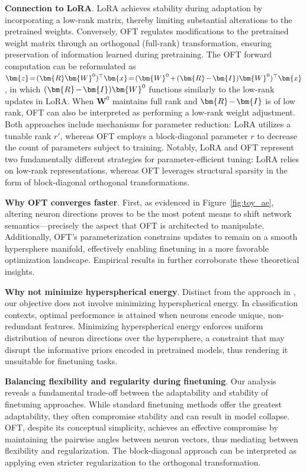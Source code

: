{\textbf{Connection to LoRA}. LoRA achieves stability during adaptation by incorporating a low-rank matrix, thereby limiting substantial alterations to the pretrained weights. Conversely, OFT regulates modifications to the pretrained weight matrix through an orthogonal (full-rank) transformation, ensuring preservation of information learned during pretraining. The OFT forward computation can be reformulated as $\thickmuskip=2mu \medmuskip=2mu \bm{z}=(\bm{R}\bm{W}^0)^\top\bm{x}=(\bm{W}^0+(\bm{R}-\bm{I})\bm{W}^0)^\top\bm{x}$, in which $\thickmuskip=2mu \medmuskip=2mu (\bm{R}-\bm{I})\bm{W}^0$ functions similarly to the low-rank updates in LoRA. When $\bm{W}^0$ maintains full rank and $\thickmuskip=2mu \medmuskip=2mu \bm{R}-\bm{I}$ is of low rank, OFT can also be interpreted as performing a low-rank weight adjustment. Both approaches include mechanisms for parameter reduction: LoRA utilizes a tunable rank $r'$, whereas OFT employs a block-diagonal parameter $r$ to decrease the count of parameters subject to training. Notably, LoRA and OFT represent two fundamentally different strategies for parameter-efficient tuning: LoRA relies on low-rank representations, whereas OFT leverages structural sparsity in the form of block-diagonal orthogonal transformations.

\textbf{Why OFT converges faster}. First, as evidenced in Figure~\ref{fig:toy_ae}, altering neuron directions proves to be the most potent means to shift network semantics—precisely the aspect that OFT is architected to manipulate. Additionally, OFT’s parameterization constrains updates to remain on a smooth hypersphere manifold, effectively enabling finetuning in a more favorable optimization landscape. Empirical results in \cite{liu2021orthogonal} further corroborate these theoretical insights.

\textbf{Why not minimize hyperspherical energy}. Distinct from the approach in \cite{liu2021orthogonal}, our objective does not involve minimizing hyperspherical energy. In classification contexts, optimal performance is attained when neurons encode unique, non-redundant features. Minimizing hyperspherical energy enforces uniform distribution of neuron directions over the hypersphere, a constraint that may disrupt the informative priors encoded in pretrained models, thus rendering it unsuitable for finetuning tasks.

\textbf{Balancing flexibility and regularity during finetuning}. Our analysis reveals a fundamental trade-off between the adaptability and stability of finetuning approaches. While standard finetuning methods offer the greatest adaptability, they often compromise stability and can result in model collapse. OFT, despite its conceptual simplicity, achieves an effective compromise by maintaining the pairwise angles between neuron vectors, thus mediating between flexibility and regularization. The block-diagonal approach can be interpreted as applying even stricter regularization to the orthogonal transformation.

}
